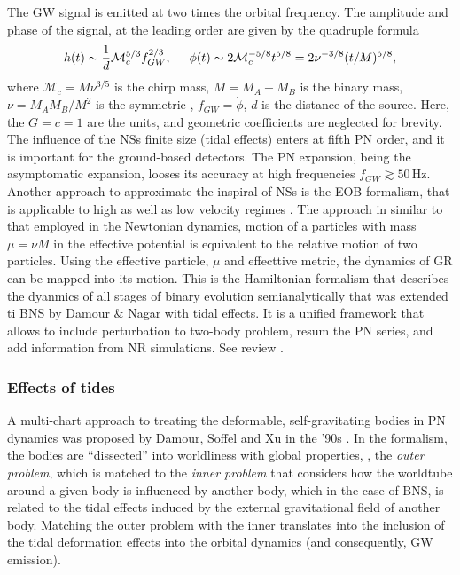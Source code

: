The \ac{GW} signal is emitted at two times the orbital frequency. The amplitude and phase of 
the signal, at the leading order are given by the quadruple formula 
%
\begin{equation}
    h(t) \sim \frac{1}{d}\mathcal{M}_c^{5/3} f_{GW}^{2/3}, \hspace{5mm} \phi(t) \sim 2\mathcal{M}_c^{-5/8}t^{5/8} = 2\nu^{-3/8}(t/M)^{5/8},
\end{equation}
%
where $\mathcal{M}_c = M\nu^{3/5}$ is the chirp mass, $M=M_A + M_B$ is the binary mass, 
$\nu=M_A M_B/M^2$ is the symmetric \mr{}, $f_{GW} = \dot{\phi}$, $d$ is the distance of the source.
Here, the $G=c=1$ are the units, and geometric coefficients are neglected for brevity. 
%
The influence of the \acp{NS} finite size (tidal effects) enters at fifth \ac{PN} order, 
and it is important for the ground-based detectors. 
%
The \ac{PN} expansion, being the asymptomatic expansion, looses its accuracy at high 
frequencies $f_{GW}\gtrsim 50\,$Hz. 
%
Another approach to approximate the inspiral of \acp{NS} is the \ac{EOB} formalism, that 
is applicable to high as well as low velocity regimes \cite{28}.
The approach in similar to that employed in the Newtonian dynamics, motion of a particles 
with mass $\mu=\nu M$ in the effective potential is equivalent to the relative motion of two 
particles. Using the effective particle, $\mu$ and effecttive metric, the dynamics of 
\ac{GR} can be mapped into its motion. 
This is the Hamiltonian formalism that describes the dyanmics of all stages of binary evolution 
semianalytically that was extended ti \ac{BNS} by Damour \& Nagar \cite{29} with tidal effects.
It is a unified framework that allows to include perturbation to two-body problem, 
resum the \ac{PN} series, and add information from \ac{NR} simulations. See review \cite{30}.

\subsubsection{Effects of tides}

A multi-chart approach to treating the deformable, self-gravitating bodies in \ac{PN} dynamics 
was proposed by Damour, Soffel and Xu in the '90s \cite{31}. In the formalism, the bodies are 
``dissected''  into worldliness with global properties, \ie, the \textit{outer problem}, 
which is matched to the \textit{inner problem} that considers how the worldtube around a given 
body is influenced by another body, which in the case of \ac{BNS}, is related to the 
tidal effects induced by the external gravitational field of another body.
Matching the outer problem with the inner translates into the inclusion of the tidal 
deformation effects into the orbital dynamics (and consequently, \ac{GW} emission). 

